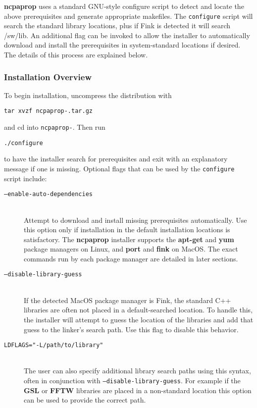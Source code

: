 \textbf{ncpaprop} uses a standard GNU-style configure script to detect and locate the above prerequisites and generate appropriate makefiles.  The \texttt{configure} script will search the standard library locations, plus if Fink is detected it will search /sw/lib. An additional flag can be invoked to allow the installer to automatically download and install the prerequisites in system-standard locations if desired. The details of this process are explained below.

\subsubsection{Installation Overview}

To begin installation, uncompress the distribution with 

\texttt{tar xvzf ncpaprop-{\version}.tar.gz}

\noindent
and cd into \texttt{ncpaprop-\version}.  Then run

\texttt{./configure}

\noindent
to have the installer search for prerequisites and exit with an explanatory message if one is missing.  Optional flags that can be used by the \texttt{configure} script include:

\begin{description}
\item[\texttt{--enable-auto-dependencies}]\hfill \\
\noindent
Attempt to download and install missing prerequisites automatically. Use this option only if installation in the default installation locations is satisfactory. The \textbf{ncpaprop} installer supports the \textbf{apt-get} and \textbf{yum} package managers on Linux, and \textbf{port} and \textbf{fink} on MacOS.  The exact commands run by each package manager are detailed in later sections.

\item[\texttt{--disable-library-guess}]\hfill \\
\noindent
If the detected MacOS package manager is Fink, the standard C++ libraries are often not placed in a default-searched location.  To handle this, the installer will attempt to guess the location of the libraries and add that guess to the linker's search path.  Use this flag to disable this behavior.

\item[\texttt{LDFLAGS="-L/path/to/library"}]\hfill \\
\noindent
The user can also specify additional library search paths using this syntax, often in conjunction with \texttt{--disable-library-guess}. For example if the \textbf{GSL} or \textbf{FFTW} libraries are placed in a non-standard location this option can be used to provide the correct path. 
\end{description}

